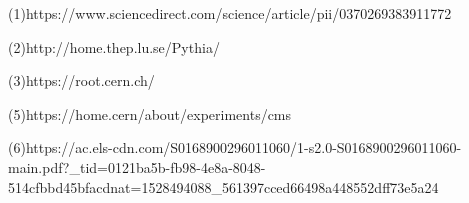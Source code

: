 \documentclass[12pt,a4paper]{article}		%
\begin{document}



\pagebreak
(1)https://www.sciencedirect.com/science/article/pii/0370269383911772
  
(2)http://home.thep.lu.se/Pythia/
 
(3)https://root.cern.ch/ 
 
 
 (5)https://home.cern/about/experiments/cms
 
(6)https://ac.els-cdn.com/S0168900296011060/1-s2.0-S0168900296011060-main.pdf?_tid=0121ba5b-fb98-4e8a-8048-514cfbbd45bfacdnat=1528494088_561397cced66498a448552dff73e5a24 
 
 
\end{document}
